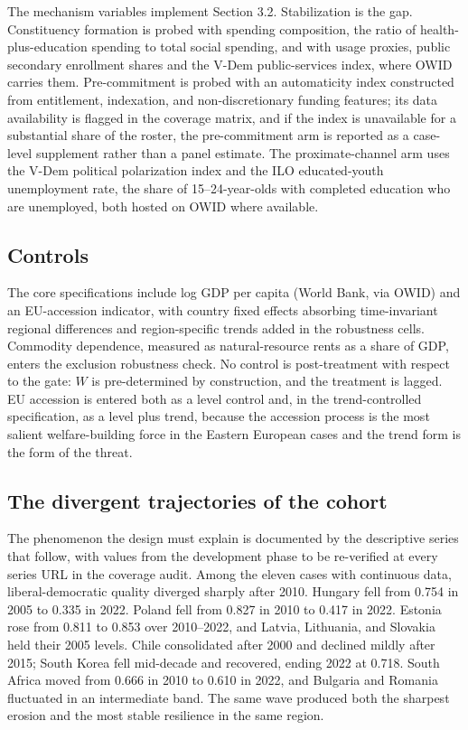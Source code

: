 \documentclass[11pt,letterpaper]{article}
\begin{document}
The mechanism variables implement Section 3.2. Stabilization is the gap. Constituency formation is probed with spending composition, the ratio of health-plus-education spending to total social spending, and with usage proxies, public secondary enrollment shares and the V-Dem public-services index, where OWID carries them. Pre-commitment is probed with an automaticity index constructed from entitlement, indexation, and non-discretionary funding features; its data availability is flagged in the coverage matrix, and if the index is unavailable for a substantial share of the roster, the pre-commitment arm is reported as a case-level supplement rather than a panel estimate. The proximate-channel arm uses the V-Dem political polarization index and the ILO educated-youth unemployment rate, the share of 15--24-year-olds with completed education who are unemployed, both hosted on OWID where available.

\subsection{Controls}

The core specifications include log GDP per capita (World Bank, via OWID) and an EU-accession indicator, with country fixed effects absorbing time-invariant regional differences and region-specific trends added in the robustness cells. Commodity dependence, measured as natural-resource rents as a share of GDP, enters the exclusion robustness check. No control is post-treatment with respect to the gate: $W$ is pre-determined by construction, and the treatment is lagged. EU accession is entered both as a level control and, in the trend-controlled specification, as a level plus trend, because the accession process is the most salient welfare-building force in the Eastern European cases and the trend form is the form of the threat.

\subsection{The divergent trajectories of the cohort}

The phenomenon the design must explain is documented by the descriptive series that follow, with values from the development phase to be re-verified at every series URL in the coverage audit. Among the eleven cases with continuous data, liberal-democratic quality diverged sharply after 2010. Hungary fell from 0.754 in 2005 to 0.335 in 2022. Poland fell from 0.827 in 2010 to 0.417 in 2022. Estonia rose from 0.811 to 0.853 over 2010--2022, and Latvia, Lithuania, and Slovakia held their 2005 levels. Chile consolidated after 2000 and declined mildly after 2015; South Korea fell mid-decade and recovered, ending 2022 at 0.718. South Africa moved from 0.666 in 2010 to 0.610 in 2022, and Bulgaria and Romania fluctuated in an intermediate band. The same wave produced both the sharpest erosion and the most stable resilience in the same region.
\end{document}
